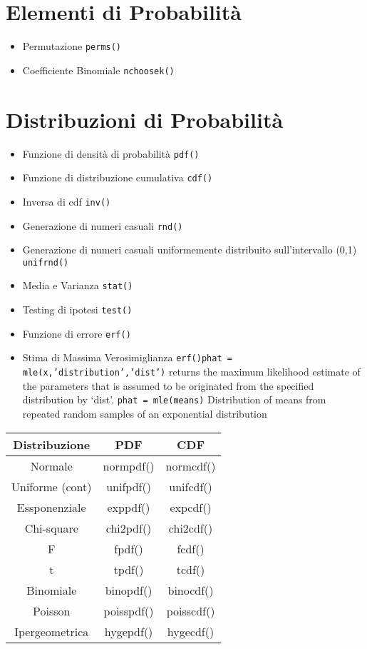 \documentclass{article}
\begin{document}
\section{Elementi di Probabilità}
\begin{itemize}
    \item Permutazione
    \subitem \texttt{perms()}
    \item Coefficiente Binomiale
    \subsubitem \texttt{nchoosek()}
\end{itemize}

\section{Distribuzioni di Probabilità}
\begin{itemize}
    \item Funzione di densità di probabilità
    \subitem \texttt{pdf()}
    \item Funzione di distribuzione cumulativa
    \subsubitem \texttt{cdf()}
    \item Inversa di cdf
    \subitem \texttt{inv()}
    \item Generazione di numeri casuali
    \subsubitem \texttt{rnd()}
    \item Generazione di numeri casuali uniformemente distribuito sull'intervallo (0,1)
    \subsubitem \texttt{unifrnd()}
    \item Media e Varianza
    \subitem \texttt{stat()}
    \item Testing di ipotesi
    \subsubitem \texttt{test()}
    \item Funzione di errore
    \subsubitem \texttt{erf()}
    \item Stima di Massima Verosimiglianza
    \subitem \texttt{erf()phat = mle(x,’distribution’,’dist’)}
    \subitem returns the maximum likelihood estimate of the
    parameters that is assumed to be originated from
    the specified distribution by ‘dist’.
    \subitem \texttt{phat = mle(means)}
    \subitem Distribution of means from repeated random
    samples of an exponential distribution
\end{itemize}

\begin{center}
    \begin{tabular}{c|c|c}
        \toprule 
        Distribuzione & PDF & CDF\\
        \midrule
        Normale & normpdf() & normcdf()\\
        Uniforme (cont) & unifpdf() & unifcdf() \\
        Essponenziale & exppdf() & expcdf()\\
        Chi-square & chi2pdf() & chi2cdf() \\
        F & fpdf() & fcdf()\\
        t & tpdf() & tcdf()\\
        Binomiale & binopdf() & binocdf()\\
        Poisson & poisspdf() & poisscdf()\\
        Ipergeometrica & hygepdf() & hygecdf()\\
        \bottomrule
    \end{tabular}   
\end{center}
\end{document}
